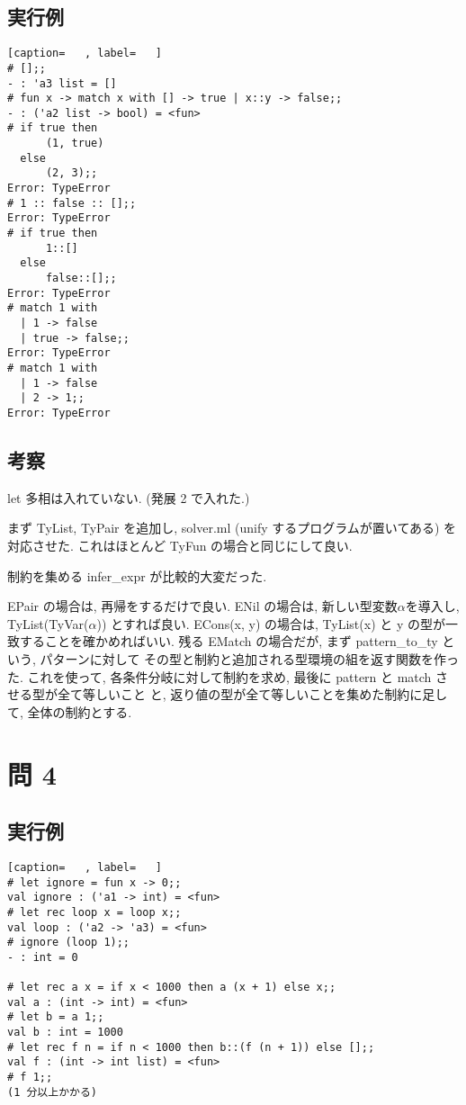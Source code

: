 \documentclass[dvipdfmx]{jsarticle}
\begin{document}
\subsection*{実行例}
\begin{lstlisting}[caption=   , label=   ]
# [];;
- : 'a3 list = []
# fun x -> match x with [] -> true | x::y -> false;;
- : ('a2 list -> bool) = <fun>
# if true then
      (1, true)
  else
      (2, 3);;
Error: TypeError
# 1 :: false :: [];;
Error: TypeError
# if true then
      1::[]
  else
      false::[];;
Error: TypeError
# match 1 with
  | 1 -> false
  | true -> false;;
Error: TypeError
# match 1 with
  | 1 -> false
  | 2 -> 1;;
Error: TypeError
\end{lstlisting}
\subsection*{考察}
let 多相は入れていない. (発展 2 で入れた.)

まず TyList, TyPair を追加し,
solver.ml (unify するプログラムが置いてある)
を対応させた. これはほとんど TyFun の場合と同じにして良い.

制約を集める infer\_expr が比較的大変だった.

EPair の場合は, 再帰をするだけで良い.
ENil の場合は, 新しい型変数$\alpha$を導入し, TyList(TyVar($\alpha$)) とすれば良い.
ECons(x, y) の場合は, TyList(x) と y の型が一致することを確かめればいい.
残る EMatch の場合だが, まず pattern\_to\_ty という, パターンに対して
その型と制約と追加される型環境の組を返す関数を作った.
これを使って, 各条件分岐に対して制約を求め, 最後に pattern と match させる型が全て等しいこと
と, 返り値の型が全て等しいことを集めた制約に足して, 全体の制約とする.


\newpage
\section*{問 4}
\subsection*{実行例}
\begin{lstlisting}[caption=   , label=   ]
# let ignore = fun x -> 0;;
val ignore : ('a1 -> int) = <fun>
# let rec loop x = loop x;;
val loop : ('a2 -> 'a3) = <fun>
# ignore (loop 1);;
- : int = 0

# let rec a x = if x < 1000 then a (x + 1) else x;;
val a : (int -> int) = <fun>
# let b = a 1;;
val b : int = 1000
# let rec f n = if n < 1000 then b::(f (n + 1)) else [];;
val f : (int -> int list) = <fun>
# f 1;;
(1 分以上かかる)
\end{lstlisting}
\end{document}
